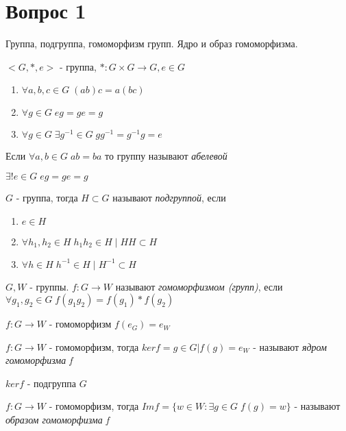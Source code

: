 \section{Вопрос 1}

Группа, подгруппа, гомоморфизм групп. Ядро и образ гомоморфизма. \newline

\begin{defn}
   \(<G, *, e>\) - группа, 
   \(*: G \times G \rightarrow G, e \in G \) 
   \begin{enumerate}       
     \item \( \forall a, b, c \in G \; (ab)c=a(bc) \)
     \item \( \forall g \in G \; eg = ge = g \)
     \item \( \forall g \in G \; \exists g^{-1} \in G \; gg^{-1} = g^{-1}g = e \)
   \end{enumerate}
   Если \( \forall a, b \in G \; ab = ba \) то группу называют \emph{абелевой} 
\end{defn}

\begin{thm}
  \( \exists ! e \in G \; eg = ge = g \)
\end{thm}

\begin{defn}
  \( G \) - группа, тогда \( H \subset G \) называют \emph{подгруппой}, если 
  \begin{enumerate}
    \item \( e \in H \)
    \item \( \forall h_1, h_2 \in H \; h_{1}h_{2} \in H \; | \; HH \subset H \)
    \item \( \forall h \in H \; h^{-1} \in H \; | \; H^{-1} \subset H \)
  \end{enumerate}
\end{defn}

\begin{defn}
  \( G, W \) - группы. \newline
  \( f: G \rightarrow W \) называют \emph{гомоморфизмом (групп)}, если \( \forall g_1, g_2 \in G \; f(g_{1}g_2) = f(g_1) * f(g_2) \)
\end{defn}

\begin{thm}
  \( f: G \rightarrow W \) - гомоморфизм \newline
  \( f(e_G) = e_W \)
\end{thm}

\begin{defn}
    \( f: G \rightarrow W \) - гомоморфизм, тогда \newline
    \( ker f = {g \in G | f(g) = e_W} \) - называют \emph{ядром гомоморфизма f}
\end{defn}

\begin{thm}
  \( ker f \) - подгруппа \( G \)
\end{thm}

\begin{defn}
   \( f: G \rightarrow W \) - гомоморфизм, тогда \newline
   \( Im f = \{ w \in W : \exists g \in G \; f(g) = w \} \) - называют \emph{образом гомоморфизма f}
\end{defn}
